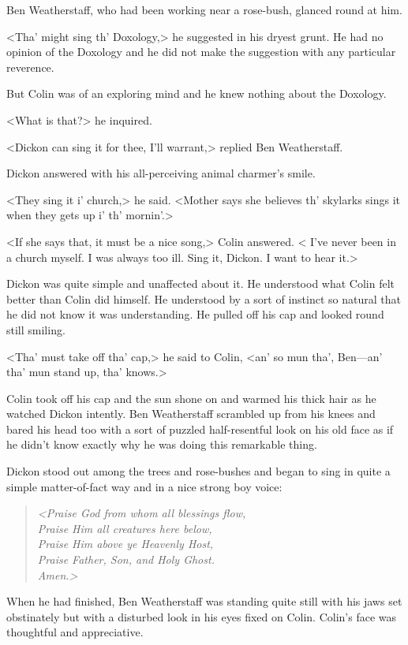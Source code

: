 Ben Weatherstaff, who had been working near a rose-bush, glanced round at him.

<Tha' might sing th' Doxology,> he suggested in his dryest grunt. He had no opinion of the Doxology and he did not make the suggestion with any particular reverence.

But Colin was of an exploring mind and he knew nothing about the Doxology.

<What is that?> he inquired.

<Dickon can sing it for thee, I'll warrant,> replied Ben Weatherstaff.

Dickon answered with his all-perceiving animal charmer's smile.

<They sing it i' church,> he said. <Mother says she believes th' skylarks sings it when they gets up i' th' mornin'.>

<If she says that, it must be a nice song,> Colin answered. < I've never been in a church myself. I was always too ill. Sing it, Dickon. I want to hear it.>

Dickon was quite simple and unaffected about it. He understood what Colin felt better than Colin did himself. He understood by a sort of instinct so natural that he did not know it was understanding. He pulled off his cap and looked round still smiling.

<Tha' must take off tha' cap,> he said to Colin, <an' so mun tha', Ben—an' tha' mun stand up, tha' knows.>

Colin took off his cap and the sun shone on and warmed his thick hair as he watched Dickon intently. Ben Weatherstaff scrambled up from his knees and bared his head too with a sort of puzzled half-resentful look on his old face as if he didn't know exactly why he was doing this remarkable thing.

Dickon stood out among the trees and rose-bushes and began to sing in quite a simple matter-of-fact way and in a nice strong boy voice:

\begin{verse}\itshape
<Praise God from whom all blessings flow,\\
Praise Him all creatures here below,\\
Praise Him above ye Heavenly Host,\\
Praise Father, Son, and Holy Ghost.\\
Amen.>
\end{verse}

When he had finished, Ben Weatherstaff was standing quite still with his jaws set obstinately but with a disturbed look in his eyes fixed on Colin. Colin's face was thoughtful and appreciative.

